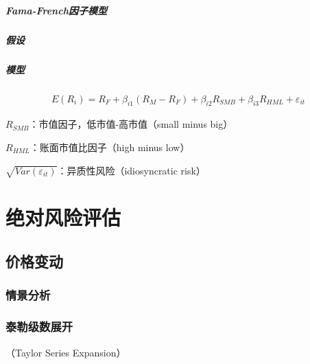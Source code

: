 \documentclass[12pt]{book}
\begin{document}
\subparagraph{Fama-French因子模型}

\subparagraph{假设}

\subparagraph{模型}	

\begin{gather*}
  E(R_i ) = R_F + \beta_{i1}(R_M-R_F) + \beta_{i2}R_{SMB} + \beta_{i3}R_{HML} + \varepsilon_{it}
\end{gather*}
\par $R_{SMB}$：市值因子，低市值-高市值（small minus big）
\par $R_{HML}$：账面市值比因子（high minus low）
\par $\sqrt{Var(\varepsilon_{it})}$：异质性风险（idiosyncratic risk）









\section{绝对风险评估}


\subsection{价格变动}


\subsubsection{情景分析}



\subsubsection{泰勒级数展开}

（Taylor Series Expansion）
\end{document}
